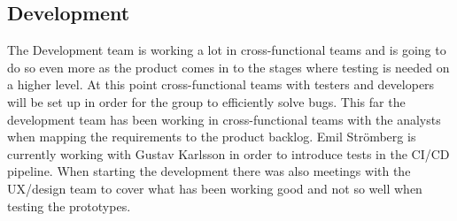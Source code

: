\subsection{Development}
The Development team is working a lot in cross-functional teams and is going to do so even more as the product comes in to the stages where testing is needed on a higher level. At this point cross-functional teams with testers and developers will be set up in order for the group to efficiently solve bugs. This far the development team has been working in cross-functional teams with the analysts when mapping the requirements to the product backlog. Emil Strömberg is currently working with Gustav Karlsson in order to introduce tests in the CI/CD pipeline. When starting the development there was also meetings with the UX/design team to cover what has been working good and not so well when testing the prototypes. 

